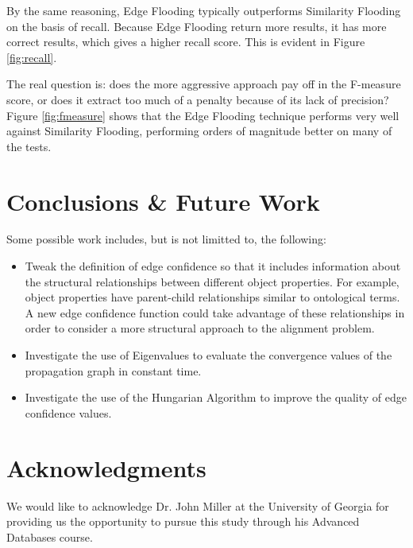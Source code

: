 \documentclass[letterpaper,twocolumn,12pt]{article}
\begin{document}
By the same reasoning, Edge Flooding typically outperforms Similarity Flooding
on the basis of recall. Because Edge Flooding return more results, it has more
correct results, which gives a higher recall score. This is evident in Figure \ref{fig:recall}.

The real question is: does the more aggressive approach pay off in the F-measure
score, or does it extract too much of a penalty because of its lack of precision?
Figure \ref{fig:fmeasure} shows that the Edge Flooding technique performs very
well against Similarity Flooding, performing orders of magnitude better on many of 
the tests.

\section{Conclusions \& Future Work}
\label{sec:conclusions}


Some possible work includes, but is not limitted to, the following:

\begin{itemize}
\item Tweak the definition of edge confidence so that it includes information about the structural relationships between different object properties.
For example, object properties have parent-child relationships similar to ontological terms.
A new edge confidence function could take advantage of these relationships in order to consider a more structural approach to the alignment problem.
\item Investigate the use of Eigenvalues to evaluate the convergence values of the propagation graph in constant time.
\item Investigate the use of the Hungarian Algorithm to improve the quality of edge confidence values.
\end{itemize}


\section*{Acknowledgments}

We would like to acknowledge Dr. John Miller at the University of Georgia for providing us the opportunity to pursue this study through his Advanced Databases course. 

%

 
\end{document}
